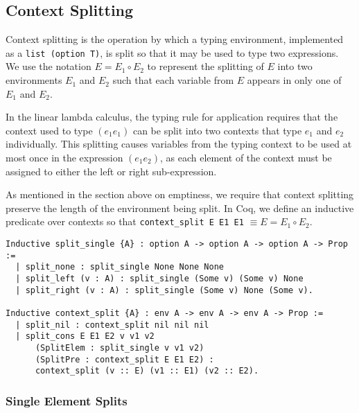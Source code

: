 \documentclass[]{unswthesis}
\let\c\texttt
\begin{document}
\subsection{Context Splitting}



Context splitting is the operation by which a typing environment, implemented as a \c{list (option T)}, is split so that it may be used to type two expressions. We use the notation $E = E_1 \circ E_2$ to represent the splitting of $E$ into two environments $E_1$ and $E_2$ such that each variable from $E$ appears in only one of $E_1$ and $E_2$.

In the linear lambda calculus, the typing rule for application requires that the context used to type $(e_1 e_1)$ can be split into two contexts that type $e_1$ and $e_2$ individually. This splitting causes variables from the typing context to be used at most once in the expression $(e_1 e_2)$, as each element of the context must be assigned to either the left or right sub-expression.

As mentioned in the section above on emptiness, we require that context splitting preserve the length of the environment being split. In Coq, we define an inductive predicate over contexts so that \c{context_split E E1 E1} $\equiv E = E_1 \circ E_2$.

\begin{verbatim}
Inductive split_single {A} : option A -> option A -> option A -> Prop :=
  | split_none : split_single None None None
  | split_left (v : A) : split_single (Some v) (Some v) None
  | split_right (v : A) : split_single (Some v) None (Some v).

Inductive context_split {A} : env A -> env A -> env A -> Prop :=
  | split_nil : context_split nil nil nil
  | split_cons E E1 E2 v v1 v2
      (SplitElem : split_single v v1 v2)
      (SplitPre : context_split E E1 E2) :
      context_split (v :: E) (v1 :: E1) (v2 :: E2).
\end{verbatim}

\subsubsection{Single Element Splits}
\end{document}
